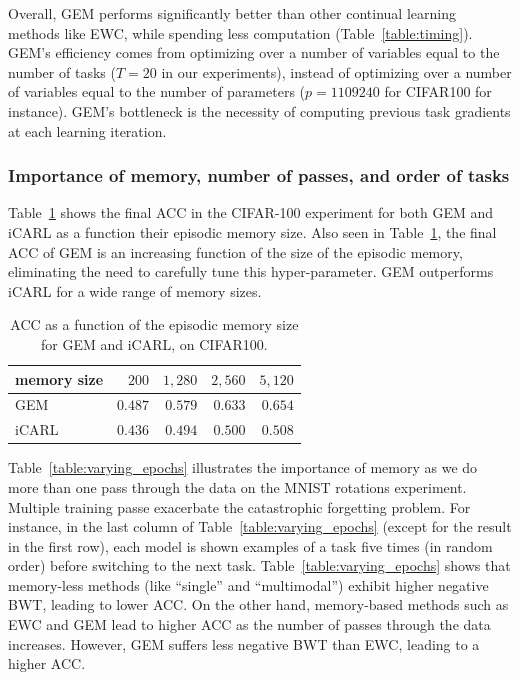 \documentclass{article}
\begin{document}
Overall, GEM performs significantly better than other continual learning
methods like EWC, while spending less computation (Table~\ref{table:timing}).
GEM's efficiency comes from optimizing over a number of variables equal to the
number of tasks ($T=20$ in our experiments), instead of optimizing over a
number of variables equal to the number of parameters ($p=1109240$ for CIFAR100
for instance). GEM's bottleneck is the necessity of computing previous task
gradients at each learning iteration.

\subsubsection{Importance of memory, number of passes, and order of tasks}
Table~\ref{table:memory} shows the final ACC in the CIFAR-100 experiment for
both GEM and iCARL as a function their episodic memory size. Also seen in
Table~\ref{table:memory}, the final ACC of GEM is an increasing function of the
size of the episodic memory, eliminating the need to carefully tune this
hyper-parameter. GEM outperforms iCARL for a wide range of memory sizes.
\begin{table}
  \caption{ACC as a function of the episodic memory size for GEM and iCARL, on
  CIFAR100.}
  \begin{center}
  \begin{tabular}{lrrrr}
  \toprule
  memory size & $200$ & $1,280$ & $2,560$ & $5,120$\\
  \midrule
  GEM & $0.487$ & $0.579$ & $0.633$ & $0.654$ \\
  iCARL & $0.436$ & $0.494$ & $0.500$  & $0.508$ \\
  \bottomrule
  \end{tabular}
  \end{center}
  \label{table:memory}
\end{table}

Table~\ref{table:varying_epochs} illustrates the importance of memory as we do
more than one pass through the data on the MNIST rotations experiment. Multiple
training passe exacerbate the catastrophic forgetting problem.  For instance,
in the last column of Table~\ref{table:varying_epochs} (except for the result
in the first row), each model is shown examples of a task five times (in random
order) before switching to the next task.  Table~\ref{table:varying_epochs}
shows that memory-less methods (like ``single'' and ``multimodal'') exhibit
higher negative BWT, leading to lower ACC.  On the other hand, memory-based
methods such as EWC and GEM lead to higher ACC  as the number of passes through
the data increases.  However, GEM suffers less negative BWT than EWC, leading
to a higher ACC.
\end{document}
